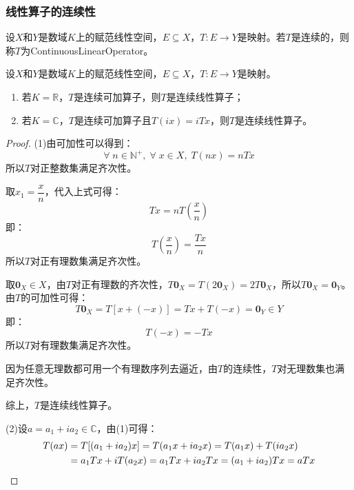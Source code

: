 \subsubsection{线性算子的连续性}
\begin{definition}
	设$X$和$Y$是数域$K$上的赋范线性空间，$E\subseteq X$，$T:E\to Y$是映射。若$T$是连续的，则称$T$为\gls{ContinuousLinearOperator}。
\end{definition}
\begin{property}\label{prop:ContinuousLinearOperator}
	设$X$和$Y$是数域$K$上的赋范线性空间，$E\subseteq X$，$T:E\to Y$是映射。
	\begin{enumerate}
		\item 若$K=\mathbb{R}$，$T$是连续可加算子，则$T$是连续线性算子；
		\item 若$K=\mathbb{C}$，$T$是连续可加算子且$T(ix)=iTx$，则$T$是连续线性算子。
	\end{enumerate}
\end{property}
\begin{proof}
	(1)由可加性可以得到：
	\begin{equation*}
		\forall\;n\in\mathbb{N}^+,\;\forall\;x\in X,\;T(nx)=nTx
	\end{equation*}	
	所以$T$对正整数集满足齐次性。\par
	取$x_1=\dfrac{x}{n}$，代入上式可得：
	\begin{equation*}
		Tx=nT\left(\frac{x}{n}\right)
	\end{equation*}
	即：
	\begin{equation*}
		T\left(\frac{x}{n}\right)=\frac{Tx}{n}
	\end{equation*}
	所以$T$对正有理数集满足齐次性。\par
	取$\mathbf{0}_X\in X$，由$T$对正有理数的齐次性，$T\mathbf{0}_X=T(2\mathbf{0}_X)=2T\mathbf{0}_X$，所以$T\mathbf{0}_X=\mathbf{0}_Y$。由$T$的可加性可得：
	\begin{equation*}
		T\mathbf{0}_X=T[x+(-x)]=Tx+T(-x)=\mathbf{0}_Y\in Y
	\end{equation*}
	即：
	\begin{equation*}
		T(-x)=-Tx
	\end{equation*}
	所以$T$对有理数集满足齐次性。\par
	因为任意无理数都可用一个有理数序列去逼近，由$T$的连续性，$T$对无理数集也满足齐次性。\par
	综上，$T$是连续线性算子。\par
	(2)设$a=a_1+ia_2\in\mathbb{C}$，由(1)可得：
	\begin{align*}
		T(ax)&=T[(a_1+ia_2)x]=T(a_1x+ia_2x)=T(a_1x)+T(ia_2x) \\
		&=a_1Tx+iT(a_2x)=a_1Tx+ia_2Tx=(a_1+ia_2)Tx=aTx\qedhere
	\end{align*}
\end{proof}

